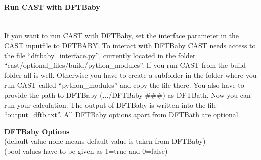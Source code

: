 \documentclass[10pt,a4paper]{article} %
\begin{document}
\paragraph{Run CAST with DFTBaby}\mbox{}\\

If you want to run CAST with DFTBaby, set the interface parameter in the CAST inputfile to DFTBABY. To interact with DFTBaby CAST needs access to the file ``dftbaby\_interface.py'', currently located in the folder ``cast/optional\_files/build/python\_modules''. If you run CAST from the build folder all is well. Otherwise you have to create a subfolder in the folder where you run CAST called ``python\_modules'' and copy the file there. You also have to provide the path to DFTBaby (.../DFTBaby-\#\#\#) as DFTBath. Now you can run your calculation. The output of DFTBaby is written into the file ``output\_dftb.txt''. All DFTBaby options apart from DFTBath are optional. 


\textbf{DFTBaby Options} 
\\(default value none means default value is taken from DFTBaby)
\\(bool values have to be given as 1=true and 0=false)
\end{document}
